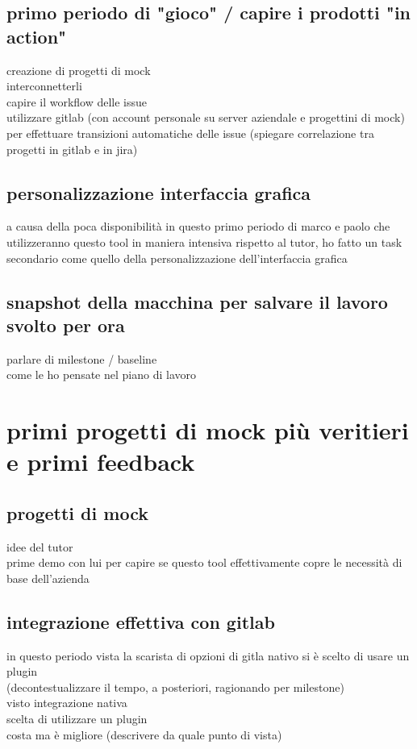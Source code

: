 	\subsection{primo periodo di "gioco" / capire i prodotti "in action"}
		creazione di progetti di mock\\
		interconnetterli\\
		capire il workflow delle issue\\
		utilizzare gitlab (con account personale su server aziendale e progettini di mock) per effettuare transizioni automatiche delle issue (spiegare correlazione tra progetti in gitlab e in jira)
	
	\subsection{personalizzazione interfaccia grafica}
		a causa della poca disponibilità in questo primo periodo di marco e paolo che utilizzeranno questo tool in maniera intensiva rispetto al tutor, ho fatto un task secondario come quello della personalizzazione dell'interfaccia grafica
	
	\subsection{snapshot della macchina per salvare il lavoro svolto per ora}
		parlare di milestone / baseline\\
		come le ho pensate nel piano di lavoro

\section{primi progetti di mock più veritieri e primi feedback}

	\subsection{progetti di mock}
		idee del tutor\\
		prime demo con lui per capire se questo tool effettivamente copre le necessità di base dell'azienda
		
	\subsection{integrazione effettiva con gitlab}
		
		in questo periodo vista la scarista di opzioni di gitla nativo si è scelto di usare un plugin\\
		(decontestualizzare il tempo, a posteriori, ragionando per milestone)\\
		visto integrazione nativa\\
		scelta di utilizzare un plugin\\
		costa ma è migliore (descrivere da quale punto di vista)
	
